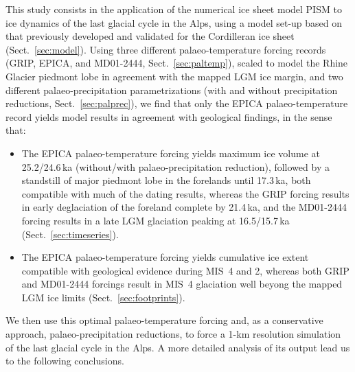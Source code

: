 \documentclass[tc, manuscript]{copernicus}
\begin{document}
\conclusions

    This study consists in the application of the numerical ice sheet model
    PISM to ice dynamics of the last glacial cycle in the Alps, using a model
    set-up based on that previously developed and validated for the Cordilleran
    ice sheet (Sect.~\ref{sec:model}).
    Using three different palaeo-temperature forcing records (GRIP, EPICA, and
    MD01-2444, Sect.~\ref{sec:paltemp}), scaled to model the Rhine Glacier
    piedmont lobe in agreement with the mapped LGM ice margin, and two
    different palaeo-precipitation parametrizations (with and without
    precipitation reductions, Sect.~\ref{sec:palprec}), we find that only the
    EPICA palaeo-temperature record yields model results in agreement with
    geological findings, in the sense that:

    \begin{itemize}
      \item The EPICA palaeo-temperature forcing yields maximum ice volume at
            25.2/24.6\,ka (without/with palaeo-precipitation reduction),
            followed by a standstill of major piedmont lobe in the forelands
            until 17.3\,ka, both compatible with much of the dating results,
            whereas the GRIP forcing results in early deglaciation of the
            foreland complete by 21.4\,ka, and the MD01-2444 forcing results in
            a late LGM glaciation peaking at 16.5/15.7\,ka
            (Sect.~\ref{sec:timeseries}).
      \item The EPICA palaeo-temperature forcing yields cumulative ice extent
            compatible with geological evidence during MIS~4 and 2, whereas
            both GRIP and MD01-2444 forcings result in MIS~4 glaciation well
            beyong the mapped LGM ice limits  (Sect.~\ref{sec:footprints}).
    \end{itemize}

    We then use this optimal palaeo-temperature forcing and, as a conservative
    approach, palaeo-precipitation reductions, to force a 1-km resolution
    simulation of the last glacial cycle in the Alps. A more detailed analysis
    of its output lead us to the following conclusions.
\end{document}
